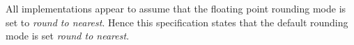 \documentclass[../Rounding-Modes.tex]{subfiles}
\begin{document}
All \CL{} implementations appear to assume that the floating point
rounding mode is set to \emph{round to nearest}.  Hence this
specification states that the default rounding mode is set \emph{round
  to nearest}.
\end{document}
